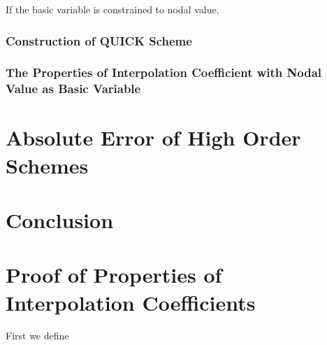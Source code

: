 \documentclass[]{article}
\begin{document}
If the basic variable is constrained to nodal value, %


\subsubsection{Construction of QUICK Scheme}


\subsubsection{The Properties of Interpolation Coefficient with Nodal Value as Basic Variable}\label{sec:prop-coeff-nodal-value}





\section{Absolute Error of High Order Schemes}
\label{sec:abserr-high-order}




\section{Conclusion}
\label{sec:conclusion}




\nocite{*}


\appendix
\section{Proof of Properties of Interpolation Coefficients}\label{sec:proof}

First we define 
\end{document}
